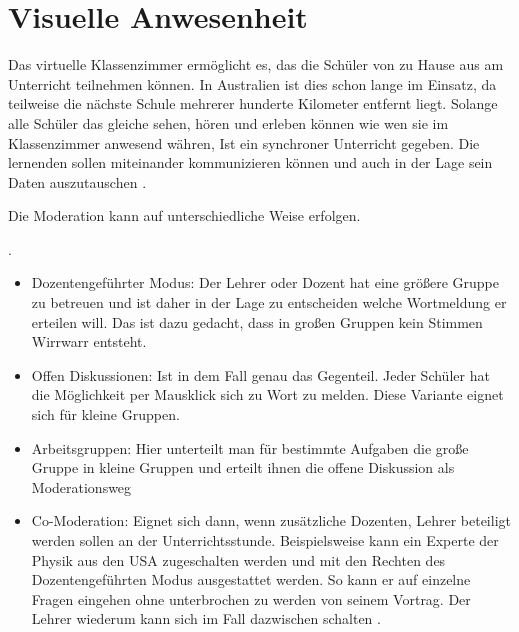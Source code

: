 \section{Visuelle Anwesenheit}
Das virtuelle Klassenzimmer ermöglicht es, das die Schüler von zu Hause aus am Unterricht teilnehmen können. In Australien ist dies schon lange im Einsatz, da teilweise die nächste Schule mehrerer hunderte Kilometer entfernt liegt. Solange alle Schüler das gleiche sehen, hören und erleben können wie wen sie im Klassenzimmer anwesend währen, Ist ein synchroner Unterricht gegeben. Die lernenden sollen miteinander kommunizieren können und auch in der Lage sein Daten auszutauschen \cite[vgl.][]{mikogo.2010}. \pagebreak

\noindent Die Moderation kann auf unterschiedliche Weise erfolgen. 

\begin{description}
	\item . 
	\begin{itemize}
		\item Dozentengeführter Modus: Der Lehrer oder Dozent hat eine größere Gruppe zu betreuen und ist daher in der Lage zu entscheiden welche Wortmeldung er erteilen will. Das ist dazu gedacht, dass in großen Gruppen kein Stimmen Wirrwarr entsteht. 
		\item Offen Diskussionen: Ist in dem Fall genau das Gegenteil. Jeder Schüler hat die Möglichkeit per Mausklick sich zu Wort zu melden. Diese Variante eignet sich für kleine Gruppen.
		\item Arbeitsgruppen: Hier unterteilt man für bestimmte Aufgaben die große Gruppe in kleine Gruppen und erteilt ihnen die offene Diskussion als Moderationsweg
		\item Co-Moderation: Eignet sich dann, wenn zusätzliche Dozenten, Lehrer beteiligt werden sollen an der Unterrichtsstunde. Beispielsweise kann ein Experte der Physik aus den USA zugeschalten werden und mit den Rechten des Dozentengeführten Modus ausgestattet werden. So kann er auf einzelne Fragen eingehen ohne unterbrochen zu werden von seinem Vortrag. Der Lehrer wiederum kann sich im Fall dazwischen schalten \cite[vgl.][]{managementcircle.de.2017}.
	\end{itemize}
\end{description}

